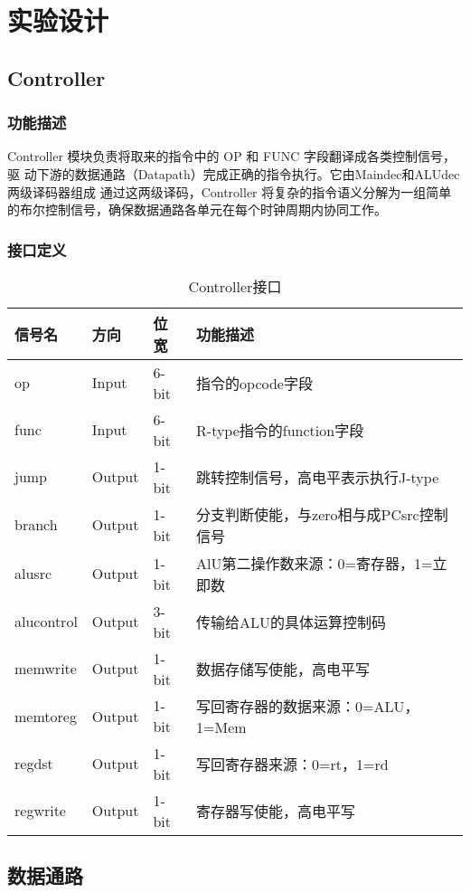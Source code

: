 \section{实验设计}

\subsection{Controller}\label{sub:controller}
\subsubsection{功能描述}
Controller 模块负责将取来的指令中的 OP 和 FUNC 字段翻译成各类控制信号，驱
动下游的数据通路（Datapath）完成正确的指令执行。它由Maindec和ALUdec两级译码器组成
通过这两级译码，Controller 将复杂的指令语义分解为一组简单的布尔控制信号，确保数据通路各单元在每个时钟周期内协同工作。
\subsubsection{接口定义}
\begin{table}[H]
\caption{Controller接口}\label{tab:Controller接口}
\begin{center}
	\begin{tabular}{|l|l|l|p{6cm}|}
	\hline
	\textbf{信号名} & \textbf{方向} & \textbf{位宽} & \textbf{功能描述}\\ \hline \hline
	op			& Input& 6-bit & 指令的opcode字段\\
	func&Input&6-bit&R-type指令的function字段\\
	jump&Output&1-bit&跳转控制信号，高电平表示执行J-type\\
	branch&Output&1-bit&分支判断使能，与zero相与成PCsrc控制信号\\
	alusrc&Output&1-bit&AlU第二操作数来源：0=寄存器，1=立即数\\
	alucontrol&Output&3-bit&传输给ALU的具体运算控制码\\
	memwrite&Output&1-bit&数据存储写使能，高电平写\\
	memtoreg&Output&1-bit&写回寄存器的数据来源：0=ALU，1=Mem\\
	regdst&Output&1-bit&写回寄存器来源：0=rt，1=rd\\
	regwrite&Output&1-bit&寄存器写使能，高电平写\\
	\hline
	\end{tabular}
\end{center}
\end{table}

\subsection{数据通路}\label{sub:datapath}
